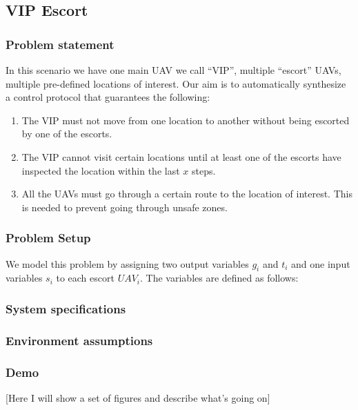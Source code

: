 \subsection{VIP Escort}\label{vip-escort}

\subsubsection{Problem statement}\label{problem-statement}

In this scenario we have one main UAV we call ``VIP'', multiple
``escort'' UAVs, multiple pre-defined locations of interest. Our aim is
to automatically synthesize a control protocol that guarantees the
following:

\begin{enumerate}
\def\labelenumi{\arabic{enumi}.}
\itemsep1pt\parskip0pt
\item
  The VIP must not move from one location to another without being
  escorted by one of the escorts.
\item
  The VIP cannot visit certain locations until at least one of the
  escorts have inspected the location within the last $x$ steps.
\item
  All the UAVs must go through a certain route to the location of
  interest. This is needed to prevent going through unsafe zones.
\end{enumerate}

\subsubsection{Problem Setup}\label{problem-setup}

We model this problem by assigning two output variables $g_{i}$ and
$t_{i}$ and one input variables $s_{i}$ to each escort $UAV_{i}$. The
variables are defined as follows:

\subsubsection{System specifications}\label{system-specifications}

\subsubsection{Environment assumptions}\label{environment-assumptions}

\subsubsection{Demo}\label{demo}

{[}Here I will show a set of figures and describe what's going on{]}
